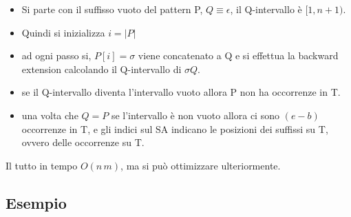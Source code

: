 \begin{itemize}
    \item Si parte con il suffisso vuoto del pattern P, $Q \equiv \epsilon$, il Q-intervallo \`e $[1,n+1)$.
    \item Quindi si inizializza $i = |P|$
    \item ad ogni passo si, $P[i] = \sigma$ viene concatenato a Q e si effettua la backward extension calcolando il Q-intervallo di $\sigma Q$.
    \item se il Q-intervallo diventa l'intervallo vuoto allora P non ha occorrenze in T.
    \item una volta che $Q = P$ se l'intervallo \`e non vuoto allora ci sono $(e-b)$ occorrenze in T, e gli indici sul SA indicano le posizioni dei suffissi su T, ovvero delle occorrenze su T.
\end{itemize}

Il tutto in tempo $O(n\,m)$, ma si pu\`o ottimizzare ulteriormente.

\subsection{Esempio}

